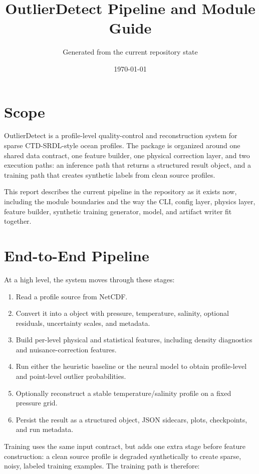 \documentclass[11pt]{article}
\title{OutlierDetect Pipeline and Module Guide}
\author{Generated from the current repository state}
\date{\today}
\newcommand{\code}[1]{\texttt{\detokenize{#1}}}
\begin{document}
\maketitle
\tableofcontents
\newpage

\section{Scope}
OutlierDetect is a profile-level quality-control and reconstruction system for sparse CTD-SRDL-style ocean profiles. The package is organized around one shared data contract, one feature builder, one physical correction layer, and two execution paths:
an inference path that returns a structured result object, and a training path that creates synthetic labels from clean source profiles.

This report describes the current pipeline in the repository as it exists now, including the module boundaries and the way the CLI, config layer, physics layer, feature builder, synthetic training generator, model, and artifact writer fit together.

\section{End-to-End Pipeline}
At a high level, the system moves through these stages:
\begin{enumerate}[leftmargin=*]
  \item Read a profile source from NetCDF.
  \item Convert it into a \code{ProfileInput} object with pressure, temperature, salinity, optional residuals, uncertainty scales, and metadata.
  \item Build per-level physical and statistical features, including density diagnostics and nuisance-correction features.
  \item Run either the heuristic baseline or the neural model to obtain profile-level and point-level outlier probabilities.
  \item Optionally reconstruct a stable temperature/salinity profile on a fixed pressure grid.
  \item Persist the result as a structured \code{Result} object, JSON sidecars, plots, checkpoints, and run metadata.
\end{enumerate}

Training uses the same input contract, but adds one extra stage before feature construction: a clean source profile is degraded synthetically to create sparse, noisy, labeled training examples. The training path is therefore:
\end{document}
